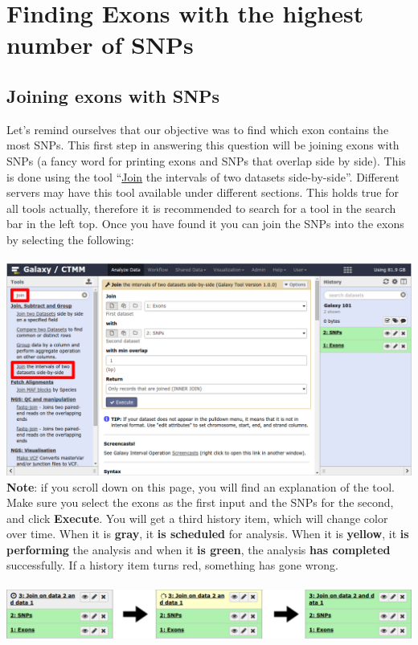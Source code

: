 \documentclass[11pt,a4paper]{article}
\begin{document}

\section{Finding Exons with the highest number of SNPs}
\subsection{Joining exons with SNPs}
Let's remind ourselves that our objective was to find which exon contains the most SNPs. This first step in answering this question will be joining exons with SNPs (a fancy word for printing exons and SNPs that overlap side by side). This is done using the tool ``\underline{Join} the intervals of two datasets side-by-side''.
Different servers may have this tool available under different sections. This holds true for all tools actually, therefore it is recommended to search for a tool in the search bar in the left top. Once you have found it you can join the SNPs into the exons by selecting the following:\\
\ \\
\includegraphics[width=\textwidth]{figures/101_11}\\
\textbf{Note}: if you scroll down on this page, you will find an explanation of the tool. Make sure you select the exons as the first input and the SNPs for the second, and click \textbf{Execute}. You will get a third history item, which will change color over time. When it is \textbf{gray}, it \textbf{is scheduled} for analysis. When it is \textbf{yellow}, it \textbf{is performing} the analysis and when it \textbf{is green}, the analysis \textbf{has completed} successfully. If a history item turns red, something has gone wrong. \\
\ \\
\includegraphics[width=\textwidth]{figures/101_12}\\
\end{document}
